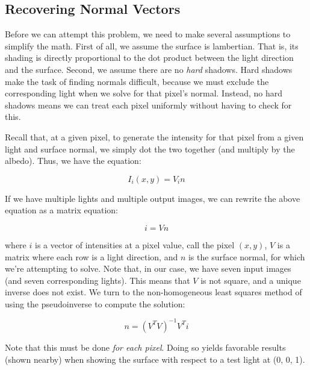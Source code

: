 \documentclass{article}
\begin{document}
\subsection{Recovering Normal Vectors}

Before we can attempt this problem, we need to make several assumptions to 
simplify the math. First of all, we assume the surface is lambertian. That is, 
its shading is directly proportional to the dot product between the light 
direction and the surface. Second, we assume there are no \textit{hard} shadows. 
Hard shadows make the task of finding normals difficult, because we must exclude 
the corresponding light when we solve for that pixel's normal. Instead, no hard 
shadows means we can treat each pixel uniformly without having to check for 
this.

Recall that, at a given pixel, to generate the intensity for that pixel from a 
given light and surface normal, we simply dot the two together (and multiply by 
the albedo). Thus, we have the equation:

$$
I_i(x, y) = V_i n
$$

If we have multiple lights and multiple output images, we can rewrite the above 
equation as a matrix equation:

$$
i = V n
$$

where $i$ is a vector of intensities at a pixel value, call the pixel $(x, y)$, 
$V$ is a matrix where each row is a light direction, and $n$ is the surface 
normal, for which we're attempting to solve. Note that, in our case, we have 
seven input images (and seven corresponding lights). This means that $V$ is not 
square, and a unique inverse does not exist. We turn to the non-homogeneous 
least squares method of using the pseudoinverse to compute the solution:

$$
n = (V^T V)^{-1} V^T i
$$

Note that this must be done \textit{for each pixel}. Doing so yields favorable 
results (shown nearby) when showing the surface with respect to a test light 
at (0, 0, 1).
\end{document}
